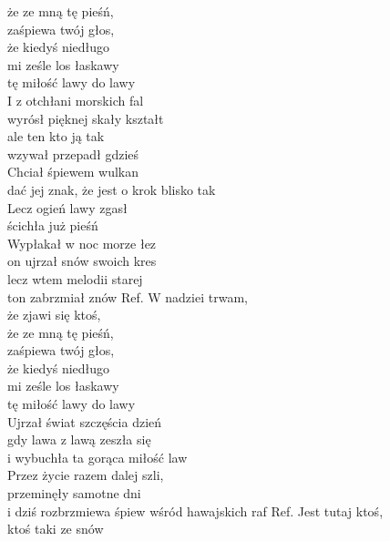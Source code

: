 \begin{flushleft}
\hspace{0.9cm}że ze mną tę pieśń,\\
\hspace{0.9cm}zaśpiewa twój głos,\\
\hspace{0.9cm}że kiedyś niedługo\\
\hspace{0.9cm}mi ześle los łaskawy\\
\hspace{0.9cm}tę miłość lawy do lawy\\
\hop
I z otchłani morskich fal\\
wyrósł pięknej skały kształt\\
ale ten kto ją tak\\
wzywał przepadł gdzieś\\
Chciał śpiewem wulkan\\
dać jej znak, że jest o krok blisko tak\\
Lecz ogień lawy zgasł\\
ścichła już pieśń\\
Wypłakał w noc morze łez\\
on ujrzał snów swoich kres\\
lecz wtem melodii starej\\
ton zabrzmiał znów
\hop
Ref. W nadziei trwam,\\
\hspace{0.9cm}że zjawi się ktoś,\\
\hspace{0.9cm}że ze mną tę pieśń,\\
\hspace{0.9cm}zaśpiewa twój głos,\\
\hspace{0.9cm}że kiedyś niedługo\\
\hspace{0.9cm}mi ześle los łaskawy\\
\hspace{0.9cm}tę miłość lawy do lawy\\
\hop
Ujrzał świat szczęścia dzień\\
gdy lawa z lawą zeszła się\\
i wybuchła ta gorąca miłość law\\
Przez życie razem dalej szli,\\
przeminęły samotne dni\\
i dziś rozbrzmiewa śpiew wśród hawajskich raf
\hop
Ref. Jest tutaj ktoś,\\
\hspace{0.9cm}ktoś taki ze snów\\

\end{flushleft}
